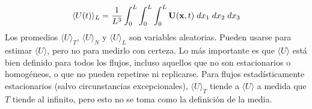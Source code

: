 $$\langle U(t) \rangle_L = \frac{1}{L^3} \int_0^{L} \int_0^{L} \int_0^{L} \mathbf{U}(\mathbf{x},t) \hspace*{1mm} dx_1 \hspace*{1mm} dx_2 \hspace*{1mm} dx_3$$
Los promedios $\langle U \rangle_T$, $\langle U \rangle_N$ y $\langle U \rangle_L$ son variables aleatorias. Pueden usarse para estimar $ \langle U \rangle$, pero no para medirlo con certeza. Lo más importante es que  $\langle U \rangle$ está bien definido para todos los flujos, incluso aquellos que no son estacionarios o homogéneos, o que no pueden repetirse ni replicarse. Para flujos estadísticamente estacionarios (salvo circunstancias excepcionales), $\langle U \rangle_T$ tiende a $\langle U \rangle$ a medida que $T$ tiende al infinito, pero esto no se toma como la definición de la media.
